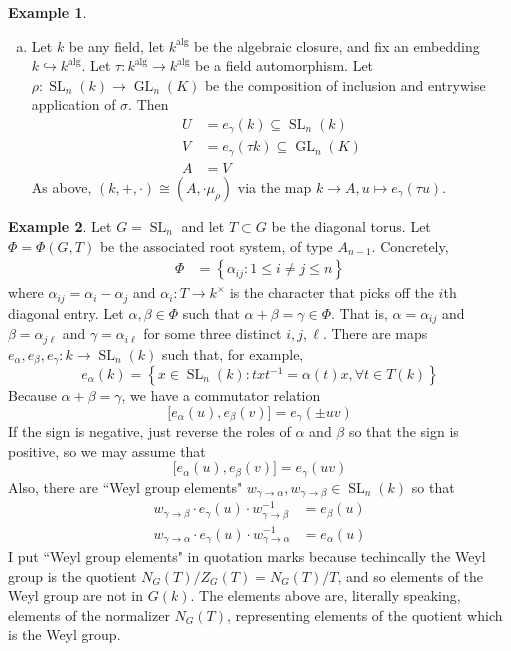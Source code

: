 \documentclass[12pt]{article}
\theoremstyle{definition}
\newtheorem{example}{Example}
\newcommand{\sig}{\sigma}
\newcommand{\lb}{\left\{}
\newcommand{\rb}{\right\}}
\newcommand{\inv}{^{-1}}
\newcommand{\into}{\hookrightarrow}
\newcommand{\iso}{\cong}
\DeclareMathOperator{\SL}{SL}
\DeclareMathOperator{\GL}{GL}
\DeclareMathOperator{\alg}{alg}
\begin{document}
\begin{example}
\begin{enumerate}[(a)]
\item Let $k$ be any field, let $k^{\alg}$ be the algebraic closure, and fix an embedding $k \into k^{\alg}$. Let $\tau:k^{\alg} \to k^{\alg}$ be a field automorphism. Let $\rho:\SL_n(k) \to \GL_n(K)$ be the composition of inclusion and entrywise application of $\sig$. Then
\begin{align*}
	U &= e_\gamma(k) \subseteq \SL_n(k) \\
	V &= e_\gamma(\tau k) \subseteq \GL_n(K) \\
	A &= V
\end{align*}
As above, $(k, +, \cdot) \iso (A, \cdot \mu_\rho)$ via the map $k \to A, u \mapsto e_\gamma(\tau u)$.
\end{enumerate}
\end{example}

\begin{example}
Let $G = \SL_n$ and let $T \subset G$ be the diagonal torus. Let $\Phi = \Phi(G, T)$ be the associated root system, of type $A_{n-1}$. Concretely,
\begin{align*}
	\Phi &= \lb \alpha_{ij} : 1 \le i \neq j \le n \rb 
\end{align*}
where $\alpha_{ij} = \alpha_i - \alpha_j$ and $\alpha_i:T \to k^\times$ is the character that picks off the $i$th diagonal entry. Let $\alpha, \beta \in \Phi$ such that $\alpha+\beta = \gamma \in \Phi$. That is, $\alpha = \alpha_{ij}$ and $\beta = \alpha_{j\ell}$ and $\gamma = \alpha_{i\ell}$ for some three distinct $i,j,\ell$. There are maps $e_\alpha, e_\beta, e_\gamma:k \to \SL_n(k)$ such that, for example,
\[
	e_\alpha(k) = \lb x \in \SL_n(k) : txt \inv = \alpha(t) x, \forall t \in T(k) \rb
\]
Because $\alpha + \beta = \gamma$, we have a commutator relation
\[
	\Big[ e_\alpha(u), e_\beta(v) \Big] = e_\gamma( \pm uv )
\]
If the sign is negative, just reverse the roles of $\alpha$ and $\beta$ so that the sign is positive, so we may assume that
\[
	\Big[ e_\alpha(u), e_\beta(v) \Big] = e_\gamma( uv )
\]
Also, there are ``Weyl group elements" $w_{\gamma \to \alpha}, w_{\gamma \to \beta} \in \SL_n(k)$ so that
\begin{align*}
	w_{\gamma \to \beta} \cdot e_\gamma(u) \cdot w_{\gamma \to \beta} \inv &= e_\beta(u) \\
	w_{\gamma \to \alpha} \cdot e_\gamma(u) \cdot w_{\gamma \to \alpha} \inv &= e_\alpha(u)
\end{align*}
I put ``Weyl group elements" in quotation marks because techincally the Weyl group is the quotient $N_G(T)/ Z_G(T) = N_G(T)/T$, and so elements of the Weyl group are not in $G(k)$. The elements above are, literally speaking, elements of the normalizer $N_G(T)$, representing elements of the quotient which is the Weyl group.
\end{example}
\end{document}
